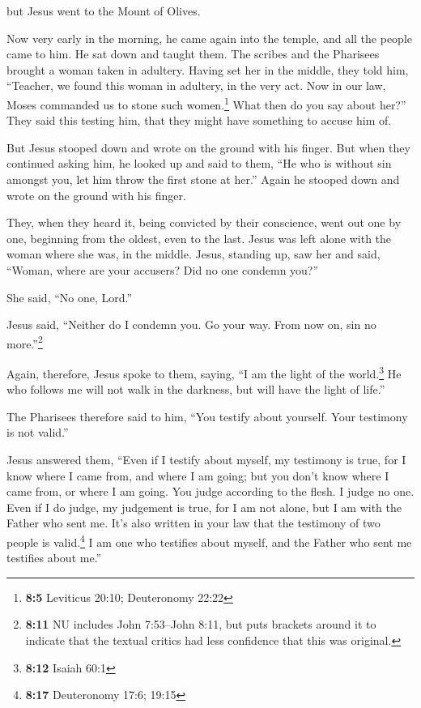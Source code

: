  but Jesus went to the Mount of Olives.

 Now very early in the morning, he came again into the
temple, and all the people came to him. He sat down and taught them.
 The scribes and the Pharisees brought a woman taken in
adultery. Having set her in the middle,  they told him,
``Teacher, we found this woman in adultery, in the very act.
 Now in our law, Moses commanded us to stone such
women.\footnote{\textbf{8:5} Leviticus 20:10; Deuteronomy 22:22} What
then do you say about her?''  They said this testing him,
that they might have something to accuse him of.

But Jesus stooped down and wrote on the ground with his finger.
 But when they continued asking him, he looked up and said
to them, ``He who is without sin amongst you, let him throw the first
stone at her.''  Again he stooped down and wrote on the
ground with his finger.

 They, when they heard it, being convicted by their
conscience, went out one by one, beginning from the oldest, even to the
last. Jesus was left alone with the woman where she was, in the middle.
 Jesus, standing up, saw her and said, ``Woman, where are
your accusers? Did no one condemn you?''

 She said, ``No one, Lord.''

Jesus said, ``Neither do I condemn you. Go your way. From now on, sin no
more.''\footnote{\textbf{8:11} NU includes John 7:53--John 8:11, but
  puts brackets around it to indicate that the textual critics had less
  confidence that this was original.}

 Again, therefore, Jesus spoke to them, saying, ``I am
the light of the world.\footnote{\textbf{8:12} Isaiah 60:1} He who
follows me will not walk in the darkness, but will have the light of
life.''

 The Pharisees therefore said to him, ``You testify about
yourself. Your testimony is not valid.''

 Jesus answered them, ``Even if I testify about myself,
my testimony is true, for I know where I came from, and where I am
going; but you don't know where I came from, or where I am going.
 You judge according to the flesh. I judge no one.
 Even if I do judge, my judgement is true, for I am not
alone, but I am with the Father who sent me.  It's also
written in your law that the testimony of two people is
valid.\footnote{\textbf{8:17} Deuteronomy 17:6; 19:15}  I
am one who testifies about myself, and the Father who sent me testifies
about me.''

